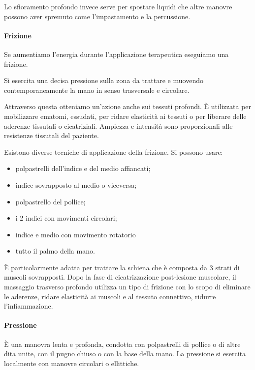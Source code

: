 Lo sfioramento profondo invece serve per spostare liquidi che altre
manovre possono aver spremuto come l'impastamento e la percussione.

\paragraph{Frizione}


Se aumentiamo l'energia durante l'applicazione terapeutica eseguiamo una
frizione.

Si esercita una decisa pressione sulla zona da trattare e muovendo
contemporaneamente la mano in senso trasversale e circolare.

Attraverso questa otteniamo un'azione anche sui tessuti profondi. È
utilizzata per mobilizzare ematomi, essudati, per ridare elasticità ai
tessuti o per liberare delle aderenze tissutali o cicatriziali. Ampiezza
e intensità sono proporzionali alle resistenze tissutali del paziente.

Esistono diverse tecniche di applicazione della frizione. Si possono
usare:

\begin{itemize}
\item
  polpastrelli dell'indice e del medio affiancati;
\item
  indice sovrapposto al medio o viceversa;
\item
  polpastrello del pollice;
\item
  i 2 indici con movimenti circolari;
\item
  indice e medio con movimento rotatorio
\item
  tutto il palmo della mano.
\end{itemize}

È particolarmente adatta per trattare la schiena che è composta da 3
strati di muscoli sovrapposti. Dopo la fase di cicatrizzazione
post-lesione muscolare, il massaggio trasverso profondo utilizza un tipo
di frizione con lo scopo di eliminare le aderenze, ridare elasticità ai
muscoli e al tessuto connettivo, ridurre l'infiammazione.

\paragraph{Pressione}


È una manovra lenta e profonda, condotta con polpastrelli di pollice o
di altre dita unite, con il pugno chiuso o con la base della mano. La
pressione si esercita localmente con manovre circolari o ellittiche.

